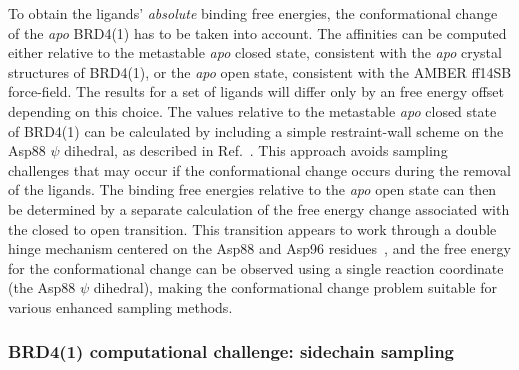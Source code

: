 \documentclass[aps,pre,twocolumn,nofootinbib,superscriptaddress,10pt, final,tightenlines]{revtex4-1}
\begin{document}
To obtain the ligands' \emph{absolute} binding free energies, the conformational change of the \emph{apo} BRD4(1) has to be taken into account.
The affinities can be computed either relative to the metastable \emph{apo} closed state, consistent with the \emph{apo} crystal structures of BRD4(1), or the \emph{apo} open state, consistent with the AMBER ff14SB force-field. 
The results for a set of ligands will differ only by an free energy offset depending on this choice. 
The values relative to the metastable \emph{apo} closed state of BRD4(1) can be calculated by including a simple restraint-wall scheme on the Asp88 $\psi$ dihedral, as described in  Ref.~\cite{Heinzelmann:2017:J.Chem.TheoryComput.}. 
This approach avoids sampling challenges that may occur if the conformational change occurs during the removal of the ligands.
The binding free energies relative to the \emph{apo} open state can then be determined by a separate calculation of the free energy change associated with the closed to open transition.
This transition appears to work through a double hinge mechanism centered on the Asp88 and Asp96 residues~\cite{Heinzelmann:2017:J.Chem.TheoryComput.}, and the free energy for the conformational change can be observed using a single reaction coordinate (the Asp88 $\psi$ dihedral), making the conformational change problem suitable for various enhanced sampling methods. 


\subsubsection{BRD4(1) computational challenge: sidechain sampling}
\end{document}
